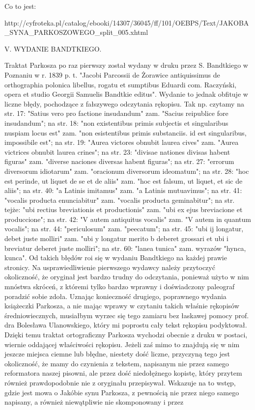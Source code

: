 \newcommand{\overstr}[1]{\annotatetextMagenta{⟦#1⟧}{przekreślenia}}

Co to jest:

http://cyfroteka.pl/catalog/ebooki/14307/36045/ff/101/OEBPS/Text/JAKOBA_SYNA_PARKOSZOWEGO_split_005.xhtml

V. WYDANIE BANDTKIEGO.

 

Traktat Parkosza po raz pierwszy został wydany w druku przez S. Bandtkiego w Poznaniu w r. 1839 p. t. "Jacobi Parcossii de Żorawice antiquissimus de orthographia polonica libellus, rogatu et sumptibus Eduardi com. Raczyński, opera et studio Georgii Samuelis Bandtkie editus". Wydanie to jednak obfituje w liczne błędy, pochodzące z fałszywego odczytania rękopisu. Tak np. czytamy na str. 17: "Satius vero pro factione insudandum" zam. "Sacius reipublice fore insudandum"; na str. 18: "non existentibus primis subjectis et singularibus nuspiam locus est" zam. "non esistentibus primis substanciis. id est singularibus, impossibile est"; na str. 19: "Aurea victores obnubit laurea cives" zam. "Aurea victrices obnubit laurea crines"; na str. 23: "divisae nationes divisas habent figuras" zam. "diverse naciones diversas habent figuras"; na str. 27: "errorum diversorum idiotarum" zam. "oracionum diversorum ideomatum"; na str. 28: "hoc est perinde, ut liquet de se et de aliis" zam. "hoc est falsum, ut liquet, et sic de aliis"; na str. 40: "a Latinis imitamus" zam. "a Latinis mutuavimus"; na str. 41: "vocalis producta enunciabitur" zam. "vocalis producta geminabitur"; na str. tejże: "ubi rectius breviationis et productionis" zam. "ubi ex ejus breviacione et produccione"; na str. 42: "V autem antiquitus vocalis" zam. "V autem in quantum vocalis"; na str. 44: "periculosum" zam. "peecatum"; na str. 45: "ubi ij longatur, debet juste molliri" zam. "ubi y longatur merito b deberet grossari et ubi i breviatur deberet juste molliri"; na str. 60: "lanea tunica" zam. wyrazów "hynca, kunca". Od takich błędów roi się w wydaniu Bandtkiego na każdej prawie stronicy. Na usprawiedliwienie pierwszego wydawcy należy przytoczyć okoliczność, że oryginał jest bardzo trudny do odczytania, ponieważ użyto w nim mnóstwa skróceń, z któremi tylko bardzo wprawny i doświadczony paleograf poradzić sobie zdoła. Uznając konieczność drugiego, poprawnego wydania książeczki Parkosza, a nie mając wprawy w czytaniu takich właśnie rękopisów średniowiecznych, musiałbym wyrzec się tego zamiaru bez łaskawej pomocy prof. dra Bolesława Ulanowskiego, który mi poprostu cały tekst rękopisu podyktował. Dzięki temu traktat ortograficzny Parkosza wychodzi obecnie z druku w postaci, wiernie oddającej właściwości rękopisu. Jeżeli zaś mimo to znajdują się w nim jeszcze miejsca ciemne lub błędne, niestety dość liczne, przyczyną tego jest okoliczność, że mamy do czynienia z tekstem, napisanym nie przez samego reformatora naszej pisowni, ale przez dość niedołężnego kopistę, który przytem również prawdopodobnie nie z oryginału przepisywał. Wskazuje na to wstęp, gdzie jest mowa o Jakóbie synu Parkosza, z pewnością nie przez niego samego napisany, a również niewątpliwie nie skomponowany i przez 